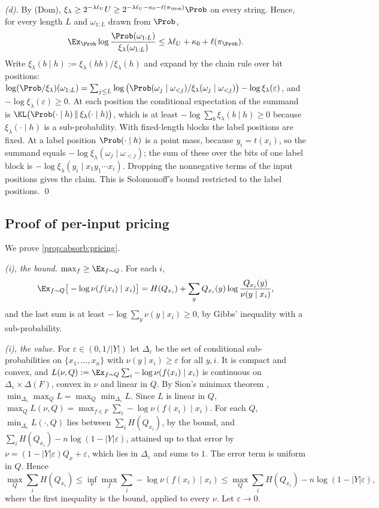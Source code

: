 \emph{(d).} By (Dom), $\xi_\lambda\ge2^{-\lambda\ell_U}U\ge2^{-\lambda\ell_U-\kappa_0-\ell(\pi_{\Prob})}\Prob$ on every string. Hence, for every length $L$ and $\omega_{1:L}$ drawn from $\Prob$,
\[
\Ex_{\Prob}\log\frac{\Prob(\omega_{1:L})}{\xi_\lambda(\omega_{1:L})}\le\lambda\ell_U+\kappa_0+\ell(\pi_{\Prob}).
\]
Write $\xi_\lambda(b\mid h):=\xi_\lambda(hb)/\xi_\lambda(h)$ and expand by the chain rule over bit positions: $\log(\Prob/\xi_\lambda)(\omega_{1:L})=\sum_{j\le L}\log\big(\Prob(\omega_j\mid\omega_{<j})/\xi_\lambda(\omega_j\mid\omega_{<j})\big)-\log\xi_\lambda(\varepsilon)$, and $-\log\xi_\lambda(\varepsilon)\ge0$. At each position the conditional expectation of the summand is $\KL\big(\Prob(\cdot\mid h)\,\|\,\xi_\lambda(\cdot\mid h)\big)$, which is at least $-\log\sum_b\xi_\lambda(b\mid h)\ge0$ because $\xi_\lambda(\cdot\mid h)$ is a sub-probability. With fixed-length blocks the label positions are fixed. At a label position $\Prob(\cdot\mid h)$ is a point mass, because $y_i=t(x_i)$, so the summand equals $-\log\xi_\lambda(\omega_j\mid\omega_{<j})$; the sum of these over the bits of one label block is $-\log\xi_\lambda(y_i\mid x_1y_1\cdots x_i)$. Dropping the nonnegative terms of the input positions gives the claim. This is Solomonoff's bound \citep{solomonoff1978complexity} restricted to the label positions. \qed

\subsection{Proof of per-input pricing}\label{app:absorb:pricing}

We prove \cref{prop:absorb:pricing}.

\emph{(i), the bound.} $\max_f\ge\Ex_{f\sim Q}$. For each $i$,
\[
\Ex_{f\sim Q}\big[-\log\nu(f(x_i)\mid x_i)\big]=H(Q_{x_i})+\sum_yQ_{x_i}(y)\log\frac{Q_{x_i}(y)}{\nu(y\mid x_i)},
\]
and the last sum is at least $-\log\sum_y\nu(y\mid x_i)\ge0$, by Gibbs' inequality with a sub-probability.

\emph{(i), the value.} For $\varepsilon\in(0,1/|Y|)$ let $\Delta_\varepsilon$ be the set of conditional sub-probabilities on $\{x_1,\dots,x_n\}$ with $\nu(y\mid x_i)\ge\varepsilon$ for all $y,i$. It is compact and convex, and $L(\nu,Q):=\Ex_{f\sim Q}\sum_i-\log\nu(f(x_i)\mid x_i)$ is continuous on $\Delta_\varepsilon\times\Delta(F)$, convex in $\nu$ and linear in $Q$. By Sion's minimax theorem \citep{sion1958general}, $\min_{\Delta_\varepsilon}\max_QL=\max_Q\min_{\Delta_\varepsilon}L$. Since $L$ is linear in $Q$, $\max_QL(\nu,Q)=\max_{f\in F}\sum_i-\log\nu(f(x_i)\mid x_i)$. For each $Q$, $\min_{\Delta_\varepsilon}L(\cdot,Q)$ lies between $\sum_iH(Q_{x_i})$, by the bound, and $\sum_iH(Q_{x_i})-n\log(1-|Y|\varepsilon)$, attained up to that error by $\nu=(1-|Y|\varepsilon)Q_x+\varepsilon$, which lies in $\Delta_\varepsilon$ and sums to $1$. The error term is uniform in $Q$. Hence
\[
\max_Q\sum_iH(Q_{x_i})\le\inf_\nu\max_f\sum_i-\log\nu(f(x_i)\mid x_i)\le\max_Q\sum_iH(Q_{x_i})-n\log(1-|Y|\varepsilon),
\]
where the first inequality is the bound, applied to every $\nu$. Let $\varepsilon\to0$.

